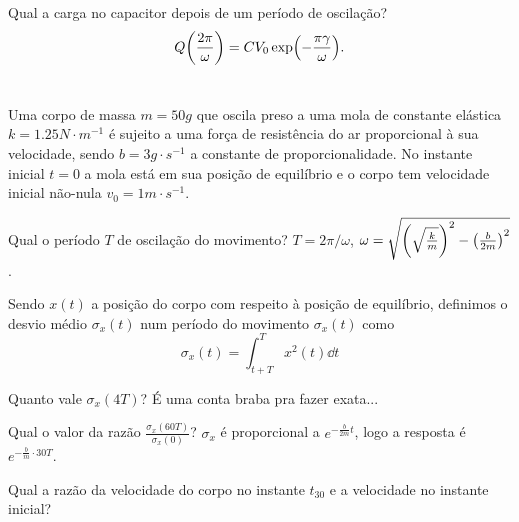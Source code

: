 \documentclass[a4paper,10pt]{article}
\begin{document}
Qual a carga no capacitor depois de um período de oscilação?
$$
Q\qty(\frac{2\pi}{\omega}) = C V_0 \exp(-\frac{\pi \gamma}{\omega}).
$$

\section{}

Uma corpo de massa $m = 50 \unit{g}$ que oscila preso a uma mola de constante elástica $k = 1.25 \unit{N \cdot m^{-1}}$ é sujeito a uma força de resistência do ar proporcional à sua velocidade, sendo $b = 3 \unit{g \cdot s^{-1}}$ a constante de proporcionalidade. No instante inicial $t = 0$ a mola está em sua posição de equilíbrio e o corpo tem velocidade inicial não-nula $v_0 = 1 \unit{m \cdot s^{-1}}$.

Qual o período $T$ de oscilação do movimento? $T = 2 \pi / \omega$, $\omega = \sqrt{\qty(\sqrt{\frac{k}{m}})^2 - \qty(\frac{b}{2m})^2}$.

Sendo $x(t)$ a posição do corpo com respeito à posição de equilíbrio, definimos o desvio médio $\sigma_x(t)$ num período do movimento $\sigma_x(t)$ como
$$
\sigma_x(t) = \int_{t + T}^T x^2(t) \dd{t}
$$

Quanto vale $\sigma_x(4T)$? É uma conta braba pra fazer exata...

Qual o valor da razão $\displaystyle{\frac{\sigma_x(60T)}{\sigma_x(0)}}$? $\sigma_x$ é proporcional a $e^{-\frac{b}{2m}t}$, logo a resposta é $e^{-\frac{b}{m} \cdot 30 T}$.

Qual a razão da velocidade do corpo no instante $t_{30}$ e a velocidade no instante inicial?
\end{document}
